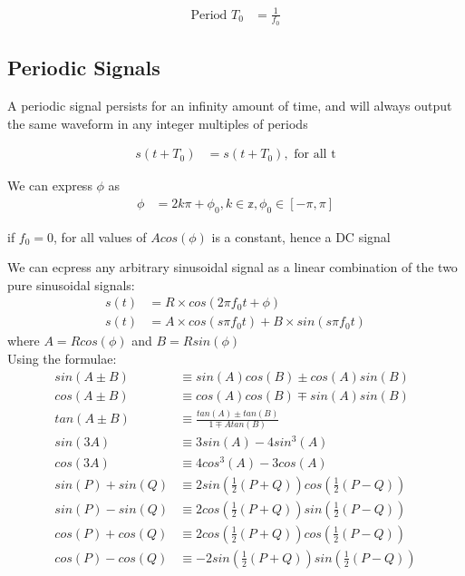 \documentclass{article}
\begin{document}
    \begin{align}
        \text{Period } T_0 &= \frac{1}{f_0}
    \end{align}
    \subsection[]{Periodic Signals}
    A periodic signal persists for an infinity amount of time, and will always output the same waveform in any integer multiples of periods

    \begin{align}
        s(t + T_0) &= s(t + T_0), \text{ for all t}
    \end{align}
    
    We can express $\phi$ as
    \begin{align}
        \phi &= 2 k \pi + \phi_0, k \in \mathbb{{z}}, \phi_0 \in [-\pi, \pi]
    \end{align}

    if $f_0 = 0$, for all values of $A cos(\phi)$ is a constant, hence a DC signal
    
    We can ecpress any arbitrary sinusoidal signal as a linear combination of the two pure sinusoidal signals:
    \begin{align}
        s(t) &= R \times cos(2 \pi f_0 t + \phi)\\
        s(t) &= A \times cos(s \pi f_0 t) + B \times sin(s \pi f_0 t)
    \end{align}
    where $A = R cos(\phi)$ and $B = R sin(\phi)$\\
    Using the formulae:
    \begin{align}
        sin(A \pm B) &\equiv sin(A)cos(B) \pm cos(A)sin(B)\\
        cos(A \pm B) &\equiv cos(A)cos(B) \mp sin(A)sin(B)\\
        tan(A \pm B) &\equiv \frac{tan(A) \pm tan(B)}{1 \mp Atan(B)}\\
        sin(3A) &\equiv 3sin(A) - 4sin^3(A)\\
        cos(3A) &\equiv 4cos^3(A) - 3cos(A)\\
        sin(P) + sin(Q) &\equiv  2 sin (\frac{1}{2}(P + Q)) cos (\frac{1}{2}(P - Q))\\
        sin(P) - sin(Q) &\equiv  2 cos (\frac{1}{2}(P + Q)) sin (\frac{1}{2}(P - Q))\\
        cos(P) + cos(Q) &\equiv  2 cos (\frac{1}{2}(P + Q)) cos (\frac{1}{2}(P - Q))\\
        cos(P) - cos(Q) &\equiv -2 sin (\frac{1}{2}(P + Q)) sin (\frac{1}{2}(P - Q))\\
    \end{align}
\end{document}
